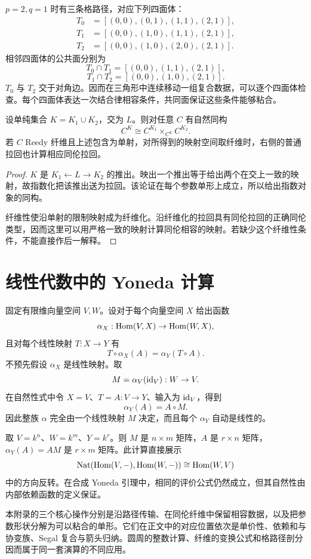 \begin{example}[三角柱的三个四面体]
$p=2,q=1$ 时有三条格路径，对应下列四面体：
\begin{align*}
 T_0&=[(0,0),(0,1),(1,1),(2,1)],\\
 T_1&=[(0,0),(1,0),(1,1),(2,1)],\\
 T_2&=[(0,0),(1,0),(2,0),(2,1)].
\end{align*}
相邻四面体的公共面分别为
\[
 T_0\cap T_1=[(0,0),(1,1),(2,1)],
\]
\[
 T_1\cap T_2=[(0,0),(1,0),(2,1)].
\]
$T_0$ 与 $T_2$ 交于对角边。因而在三角形中连续移动一组复合数据，可以逐个四面体检查。每个四面体表达一次结合律相容条件，共同面保证这些条件能够粘合。
\end{example}

\begin{proposition}[从并到相容映射]
设单纯集合 $K=K_1\cup K_2$，交为 $L$。则对任意 $C$ 有自然同构
\[
 C^K\cong C^{K_1}\times_{C^L}C^{K_2}.
\]
若 $C$ Reedy 纤维且上述包含为单射，对所得到的映射空间取纤维时，右侧的普通拉回也计算相应同伦拉回。
\end{proposition}
\begin{proof}
$K$ 是 $K_1\leftarrow L\to K_2$ 的推出。映出一个推出等于给出两个在交上一致的映射，故指数化把该推出送为拉回。该论证在每个参数单形上成立，所以给出指数对象的同构。

纤维性使沿单射的限制映射成为纤维化。沿纤维化的拉回具有同伦拉回的正确同伦类型，因而这里可以用严格一致的映射计算同伦相容的映射。若缺少这个纤维性条件，不能直接作后一解释。
\end{proof}

\section{线性代数中的 Yoneda 计算}

\begin{example}[由一族线性算子恢复一个矩阵]
固定有限维向量空间 $V,W$。设对于每个向量空间 $X$ 给出函数
\[
 \alpha_X:\operatorname{Hom}(V,X)\to\operatorname{Hom}(W,X),
\]
且对每个线性映射 $T:X\to Y$ 有
\[
 T\circ\alpha_X(A)=\alpha_Y(T\circ A).
\]
不预先假设 $\alpha_X$ 是线性映射。取
\[
 M=\alpha_V(\operatorname{id}_V):W\to V.
\]
在自然性式中令 $X=V$、$T=A:V\to Y$、输入为 $\operatorname{id}_V$，得到
\[
 \alpha_Y(A)=A\circ M.
\]
因此整族 $\alpha$ 完全由一个线性映射 $M$ 决定，而且每个 $\alpha_Y$ 自动是线性的。

取 $V=k^n$、$W=k^m$、$Y=k^r$。则 $M$ 是 $n\times m$ 矩阵，$A$ 是 $r\times n$ 矩阵，$\alpha_Y(A)=AM$ 是 $r\times m$ 矩阵。此计算直接展示
\[
 \operatorname{Nat}(\operatorname{Hom}(V,-),\operatorname{Hom}(W,-))\cong\operatorname{Hom}(W,V)
\]
中的方向反转。在合成 Yoneda 引理中，相同的评价公式仍然成立，但其自然性由内部依赖函数的定义保证。
\end{example}

\begin{remark}
本附录的三个核心操作分别是沿路径传输、在同伦纤维中保留相容数据，以及把参数形状分解为可以粘合的单形。它们在正文中的对应位置依次是单价性、依赖和与协变族、Segal 复合与箭头归纳。圆周的整数计算、纤维的变换公式和格路径剖分因而属于同一套演算的不同应用。
\end{remark}
